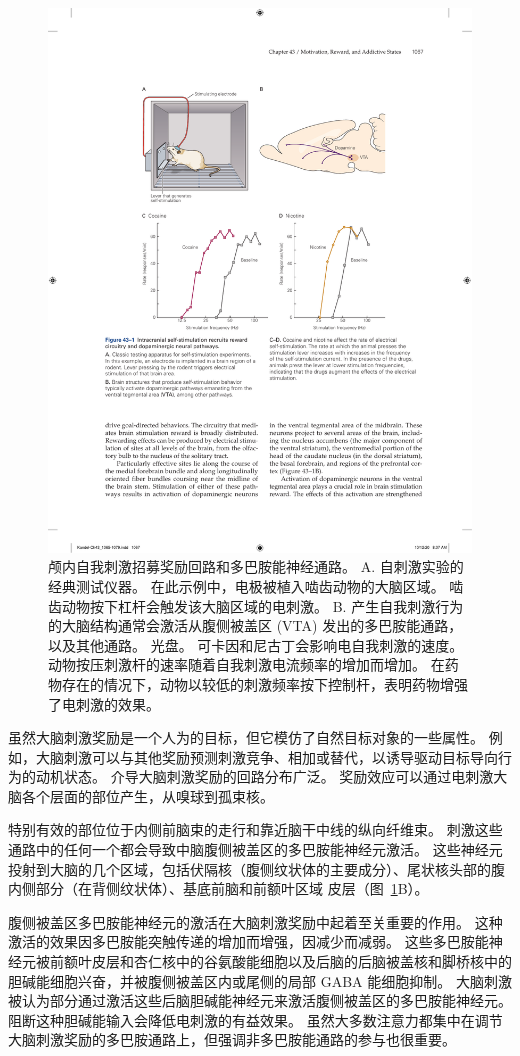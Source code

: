\begin{figure}[htbp]
	\centering
	\includegraphics[width=0.7\linewidth]{chap43/fig_43_1}
	\caption{颅内自我刺激招募奖励回路和多巴胺能神经通路。 A. 自刺激实验的经典测试仪器。 在此示例中，电极被植入啮齿动物的大脑区域。 啮齿动物按下杠杆会触发该大脑区域的电刺激。 B. 产生自我刺激行为的大脑结构通常会激活从腹侧被盖区 (VTA) 发出的多巴胺能通路，以及其他通路。 光盘。 可卡因和尼古丁会影响电自我刺激的速度。 动物按压刺激杆的速率随着自我刺激电流频率的增加而增加。 在药物存在的情况下，动物以较低的刺激频率按下控制杆，表明药物增强了电刺激的效果。}
	\label{fig:43_1}
\end{figure}


虽然大脑刺激奖励是一个人为的目标，但它模仿了自然目标对象的一些属性。
例如，大脑刺激可以与其他奖励预测刺激竞争、相加或替代，以诱导驱动目标导向行为的动机状态。
介导大脑刺激奖励的回路分布广泛。 奖励效应可以通过电刺激大脑各个层面的部位产生，从嗅球到孤束核。


特别有效的部位位于内侧前脑束的走行和靠近脑干中线的纵向纤维束。
刺激这些通路中的任何一个都会导致中脑腹侧被盖区的多巴胺能神经元激活。
这些神经元投射到大脑的几个区域，包括伏隔核（腹侧纹状体的主要成分）、尾状核头部的腹内侧部分（在背侧纹状体）、基底前脑和前额叶区域 皮层（图~\ref{fig:43_1}B）。


腹侧被盖区多巴胺能神经元的激活在大脑刺激奖励中起着至关重要的作用。
这种激活的效果因多巴胺能突触传递的增加而增强，因减少而减弱。
这些多巴胺能神经元被前额叶皮层和杏仁核中的谷氨酸能细胞以及后脑的后脑被盖核和脚桥核中的胆碱能细胞兴奋，并被腹侧被盖区内或尾侧的局部 GABA 能细胞抑制。
大脑刺激被认为部分通过激活这些后脑胆碱能神经元来激活腹侧被盖区的多巴胺能神经元。
阻断这种胆碱能输入会降低电刺激的有益效果。
虽然大多数注意力都集中在调节大脑刺激奖励的多巴胺通路上，但强调非多巴胺能通路的参与也很重要。


